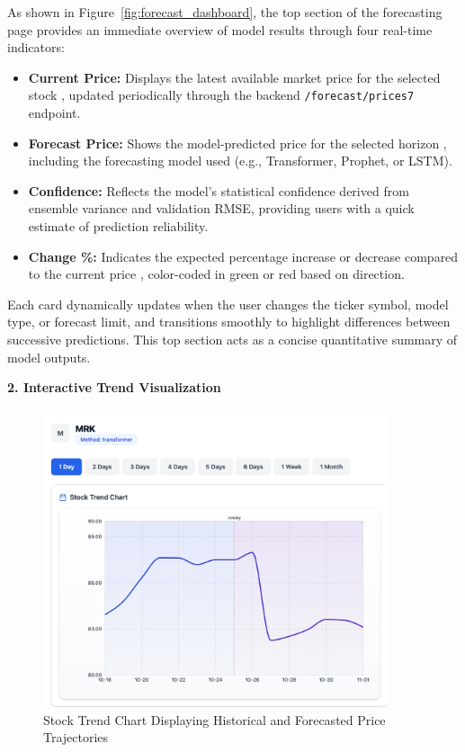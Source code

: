 As shown in Figure~\ref{fig:forecast_dashboard}, the top section of the forecasting page provides an immediate overview of model results through four real-time indicators:
\begin{itemize}
  \item \textbf{Current Price:} Displays the latest available market price for the selected stock , updated periodically through the backend \texttt{/forecast/prices7} endpoint.
  \item \textbf{Forecast Price:} Shows the model-predicted price for the selected horizon , including the forecasting model used (e.g., Transformer, Prophet, or LSTM).
  \item \textbf{Confidence:} Reflects the model’s statistical confidence derived from ensemble variance and validation RMSE, providing users with a quick estimate of prediction reliability.
  \item \textbf{Change \%:} Indicates the expected percentage increase or decrease compared to the current price , color-coded in green or red based on direction.
\end{itemize}

Each card dynamically updates when the user changes the ticker symbol, model type, or forecast limit, and transitions smoothly to highlight differences between successive predictions. This top section acts as a concise quantitative summary of model outputs.

\textbf{2. Interactive Trend Visualization}

\begin{figure}[h]
\centering
\includegraphics[width=0.9\textwidth]{images/prediction/chart.png}
\caption{Stock Trend Chart Displaying Historical and Forecasted Price Trajectories}
\label{fig:forecast_chart}
\end{figure}

